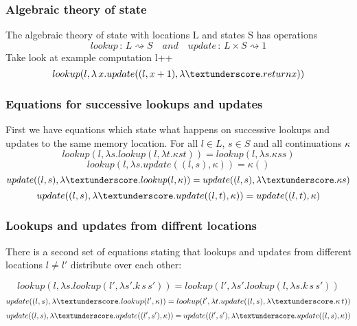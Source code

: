 \documentclass{beamer}
\begin{document}
    \begin{frame}
        \frametitle{Algebraic theory of state}
        The algebraic theory of state with locations L and states S has operations
        \[
          lookup \, : \, L  \rightsquigarrow S \quad and \quad update \, : \, L \times S  \rightsquigarrow 1
        \]
        Take look at example computation l++
        \[
            lookup(l, \lambda \, x. update((l, x + 1), \lambda \textunderscore. return x))
        \]
      
    
    \end{frame}
    
    \begin{frame}
        \frametitle{Equations for successive lookups and updates}
        First we have equations which state what happens on successive lookups and updates to
        the same memory location. For all $l \in L$, $s \in S$ and all continuations $\kappa$
        \[
            lookup(l, \lambda s . lookup(l, \lambda t . \kappa s t)) = 
            lookup(l, \lambda s . \kappa s s)
        \]
        \[
            lookup(l, \lambda s . update((l, s), \kappa)) = \kappa ()
        \]
        \[
            update((l, s), \lambda \textunderscore . lookup(l, \kappa)) = update((l,s), 
            \lambda \textunderscore . \kappa s
            )
        \]
        \[
            update((l, s), \lambda \textunderscore . update((l,t), \kappa 
            )) =   update((l,t), \kappa 
            )
        \]
        
    
    \end{frame}

    \begin{frame}
        \frametitle{Lookups and updates from diffrent locations}
        There is a second set of equations stating that lookups and updates from different 
        locations $l  \neq l'$ distribute over each other:

        \[
            lookup(l, \lambda s. lookup (l',  \lambda s'. k \, s\, s'))
            = lookup(l', \lambda s'. lookup (l,  \lambda s. k \, s\, s'))
        \]
        \[
          update((l,s), \lambda \textunderscore. lookup(l', \kappa))  
          = lookup(l', \lambda t. update((l,s), \lambda \textunderscore. \kappa \, t))
        \]
        \[
            update((l,s), \lambda \textunderscore. update((l', s'), 
            \kappa))
            =   update((l',s'), \lambda \textunderscore. update((l, s), 
            \kappa))
        \]
    
        
    
    \end{frame}
\end{document}
